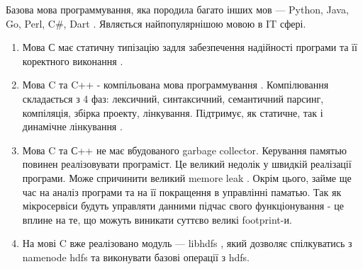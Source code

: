     Базова мова программування, яка породила багато інших мов --- Python, Java, Go, Perl, C\#, Dart \cite{lang2019cfamily}.
    Являється найпопулярнішою мовою в IT сфері.

    \begin{enumerate}
        \item Мова С має статичну типізацію задля забезпечення надійності програми та її коректного виконання \cite{clang2005intro,clang2005dynamic}.
        \item Мова C та C++ - компільована мова программування \cite{compile2014c}.
        Компілювання складається з 4 фаз: лексичний, синтаксичний, семантичний парсинг, компіляція, збірка проекту, лінкування.
        Підтримує, як статичне, так і динамічне лінкування \cite{linking2018clang,linking2019briefly}.
        \item Мова C та С++ не має вбудованого garbage collector. Керування памятью повинен реалізовувати програміст.
        Це великий недолік у швидкій реалізації програми. Може спричинити великий memore leak \cite{clang2005memory}.
        Окрім цього, займе ще час на аналіз програми та на її покращення в управлінні паматью. 
        Так як мікросервіси будуть управляти данними підчас свого функціонування - це вплине на те, що можуть виникати
        суттєво великі footprint-и.
        \item На мові C вже реалізовано модуль --- libhdfs \cite{libhdfs2018}, який дозволяє спілкуватись з namenode hdfs та виконувати базові операції з hdfs.
    \end{enumerate}



